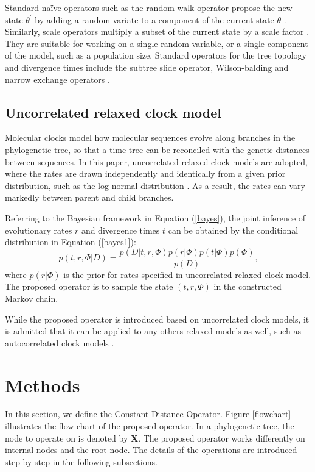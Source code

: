 \documentclass{bmcart}
\begin{document}
Standard na\"{i}ve operators such as the random walk operator propose the new state $\theta^\prime$ by adding a random variate to a component of the current state $\theta$ \cite{suchard2005stochastic}. Similarly, scale operators multiply a subset of the current state by a scale factor \cite{higuchi1997monte}. They are suitable for working on a single random variable, or a single component of the model, such as a population size. Standard operators for the tree topology and divergence times include the subtree slide operator, Wilson-balding and narrow exchange operators \cite{drummond2002estimatingdata,hohna2008clock}.

\subsection*{Uncorrelated relaxed clock model}
Molecular clocks model how molecular sequences evolve along branches in the phylogenetic tree, so that a time tree can be reconciled with the genetic distances between sequences. In this paper, uncorrelated relaxed clock models are adopted, where the rates are drawn independently and identically from a given prior distribution, such as the log-normal distribution \cite{drummond2006relaxed}. As a result, the rates can vary markedly between parent and child branches.

Referring to the Bayesian framework in Equation (\ref{bayes}), the joint inference of evolutionary rates $r$ and divergence times $t$ can be obtained by the conditional distribution in Equation (\ref{bayes1}):
\begin{equation}\label{bayes1}
p(t,r,\Phi |D) = \frac{{p(D|t,r,\Phi )p(r|\Phi )p(t|\Phi )p(\Phi )}}{{p(D)}} \text{,}
\end{equation}
where $p(r|\Phi )$ is the prior for rates specified in uncorrelated relaxed clock model. The proposed operator is to sample the state $(t,r,\Phi)$ in the constructed Markov chain.

While the proposed operator is introduced based on uncorrelated clock models, it is admitted that it can be applied to any others relaxed models as well, such as autocorrelated clock models \cite{thorne1998estimating}.
\section*{Methods}
In this section, we define the Constant Distance Operator. Figure \ref{flowchart} illustrates the flow chart of the proposed operator. In a phylogenetic tree, the node to operate on is denoted by \textbf{X}. The proposed operator works differently on internal nodes and the root node. The details of the operations are introduced step by step in the following subsections.
\end{document}
